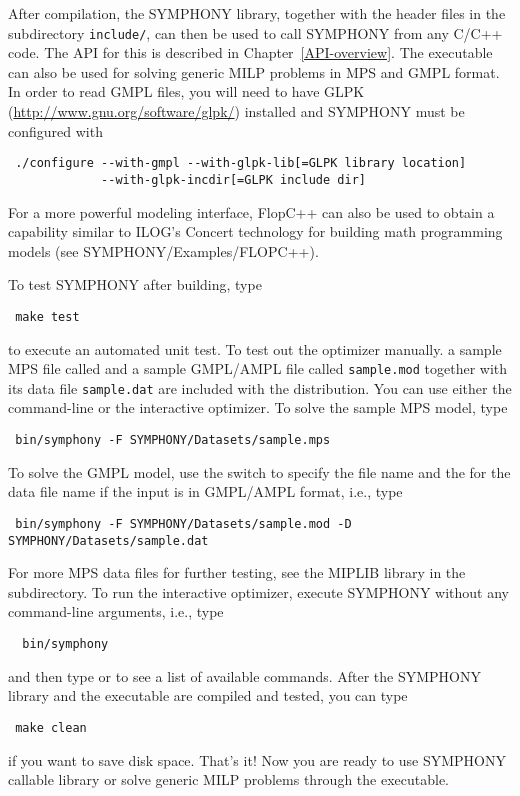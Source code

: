 After compilation, the SYMPHONY library, together with the header files in the
subdirectory {\color{Brown}\texttt{include/}}, can then be used to call
SYMPHONY from any C/C++ code. The API for this is described in
Chapter~\ref{API-overview}. The executable can also be used for solving
generic MILP problems in MPS and GMPL format. In order to read GMPL files, you
will need to have GLPK (\url{http://www.gnu.org/software/glpk/}) installed and
SYMPHONY must be configured with {\color{Brown}
\begin{verbatim}
 ./configure --with-gmpl --with-glpk-lib[=GLPK library location] 
             --with-glpk-incdir[=GLPK include dir] 
\end{verbatim}
}
For a more powerful modeling interface, FlopC++ can also be used to obtain a
capability similar to ILOG's Concert technology for building math programming
models (see SYMPHONY/Examples/FLOPC++). 

To test SYMPHONY after building, type
{\color{Brown}
\begin{verbatim}
 make test
\end{verbatim}
} to execute an automated unit test. To test out the optimizer manually. a
sample MPS file called  and a sample GMPL/AMPL file called
{\color{Brown}\texttt{sample.mod}} together with its data file
{\color{Brown}\texttt{sample.dat}} are included with the distribution. You can
use either the command-line or the interactive optimizer. To solve the sample
MPS model, type {\color{Brown}
\begin{verbatim}
 bin/symphony -F SYMPHONY/Datasets/sample.mps
\end{verbatim}
} To solve the GMPL model, use the  switch to specify the file name
and the  for the data file name if the input is in GMPL/AMPL format,
i.e., type 
{\color{Brown}
\begin{verbatim}
 bin/symphony -F SYMPHONY/Datasets/sample.mod -D SYMPHONY/Datasets/sample.dat
\end{verbatim}}
For more MPS data files for further testing, see the MIPLIB library in the
 subdirectory. To run the interactive optimizer, execute SYMPHONY
without any command-line arguments, i.e., type
{\color{Brown}
\begin{verbatim}
  bin/symphony 
\end{verbatim}}
and then type  or  to see a list of available commands.
After the SYMPHONY library and the executable are compiled and tested, you
can type
{\color{Brown}
\begin{verbatim}
 make clean 
\end{verbatim}}
if you want to save disk space. That's it! Now you are ready to use SYMPHONY
callable library or solve generic MILP problems through the executable.

